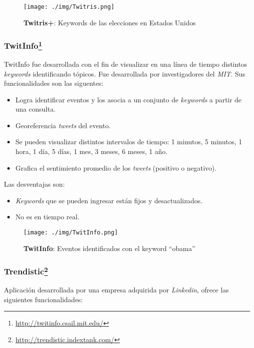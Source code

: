 \documentclass[10pt]{article}
\begin{document}
	\begin{figure}[h!]
		\centering
	    \texttt{[image: ./img/Twitris.png]}
		\caption{\textbf{Twitris+}: Keywords de las elecciones en Estados Unidos}
		\label{twitris}
	\end{figure}

\subsubsection*{TwitInfo\footnote{\url{http://twitinfo.csail.mit.edu/}}}
	TwitInfo\cite{twitinfo} fue desarrollada con el fin de visualizar en una línea de tiempo distintos \emph{keywords} identificando tópicos. Fue desarrollada por investigadores del \emph{MIT}. Sus funcionalidades son las siguentes:

	\begin{itemize}
		\item Logra identificar eventos y los asocia a un conjunto de \emph{keywords} a partir de una consulta.
		\item Georeferencia \emph{tweets} del evento.
		\item Se pueden visualizar distintos intervalos de tiempo: 1 minutos, 5 minutos, 1 hora, 1 día, 5 días, 1 mes, 3 meses, 6 meses, 1 año.
		\item Grafica el sentimiento promedio de los \emph{tweets} (positivo o negativo).
	\end{itemize}

	Las desventajas son:

	\begin{itemize}
		\item \emph{Keywords} que se pueden ingresar están fijos y desactualizados.
		\item No es en tiempo real.
	\end{itemize}

	\begin{figure}[h!]
		\centering
	    \texttt{[image: ./img/TwitInfo.png]}
		\caption{\textbf{TwitInfo}: Eventos identificados con el keyword ``obama''}
		\label{twitinfo}
	\end{figure}

\subsubsection*{Trendistic\footnote{\url{http://trendistic.indextank.com/}}}

	Aplicación desarrollada por una empresa adquirida por \emph{Linkedin}, ofrece las siguientes funcionalidades:
\end{document}
